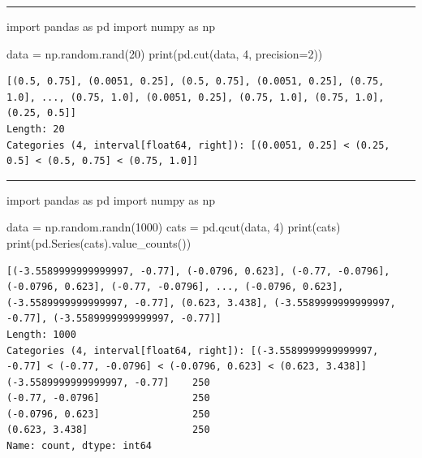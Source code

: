 \documentclass[
  polish,
  letterpaper,
  DIV=11,
  numbers=noendperiod]{scrreprt}
\newenvironment{Shaded}{\begin{snugshade}}{\end{snugshade}}
\newcommand{\BuiltInTok}[1]{\textcolor[rgb]{0.00,0.23,0.31}{#1}}
\newcommand{\DecValTok}[1]{\textcolor[rgb]{0.68,0.00,0.00}{#1}}
\newcommand{\ImportTok}[1]{\textcolor[rgb]{0.00,0.46,0.62}{#1}}
\newcommand{\NormalTok}[1]{\textcolor[rgb]{0.00,0.23,0.31}{#1}}
\newcommand{\OperatorTok}[1]{\textcolor[rgb]{0.37,0.37,0.37}{#1}}
\begin{document}
\begin{center}\rule{0.5\linewidth}{0.5pt}\end{center}

\begin{Shaded}
\begin{Highlighting}[]
\ImportTok{import}\NormalTok{ pandas }\ImportTok{as}\NormalTok{ pd}
\ImportTok{import}\NormalTok{ numpy }\ImportTok{as}\NormalTok{ np}

\NormalTok{data }\OperatorTok{=}\NormalTok{ np.random.rand(}\DecValTok{20}\NormalTok{)}
\BuiltInTok{print}\NormalTok{(pd.cut(data, }\DecValTok{4}\NormalTok{, precision}\OperatorTok{=}\DecValTok{2}\NormalTok{))}
\end{Highlighting}
\end{Shaded}

\begin{verbatim}
[(0.5, 0.75], (0.0051, 0.25], (0.5, 0.75], (0.0051, 0.25], (0.75, 1.0], ..., (0.75, 1.0], (0.0051, 0.25], (0.75, 1.0], (0.75, 1.0], (0.25, 0.5]]
Length: 20
Categories (4, interval[float64, right]): [(0.0051, 0.25] < (0.25, 0.5] < (0.5, 0.75] < (0.75, 1.0]]
\end{verbatim}

\begin{center}\rule{0.5\linewidth}{0.5pt}\end{center}

\begin{Shaded}
\begin{Highlighting}[]
\ImportTok{import}\NormalTok{ pandas }\ImportTok{as}\NormalTok{ pd}
\ImportTok{import}\NormalTok{ numpy }\ImportTok{as}\NormalTok{ np}

\NormalTok{data }\OperatorTok{=}\NormalTok{ np.random.randn(}\DecValTok{1000}\NormalTok{)}
\NormalTok{cats }\OperatorTok{=}\NormalTok{ pd.qcut(data, }\DecValTok{4}\NormalTok{)}
\BuiltInTok{print}\NormalTok{(cats)}
\BuiltInTok{print}\NormalTok{(pd.Series(cats).value\_counts())}
\end{Highlighting}
\end{Shaded}

\begin{verbatim}
[(-3.5589999999999997, -0.77], (-0.0796, 0.623], (-0.77, -0.0796], (-0.0796, 0.623], (-0.77, -0.0796], ..., (-0.0796, 0.623], (-3.5589999999999997, -0.77], (0.623, 3.438], (-3.5589999999999997, -0.77], (-3.5589999999999997, -0.77]]
Length: 1000
Categories (4, interval[float64, right]): [(-3.5589999999999997, -0.77] < (-0.77, -0.0796] < (-0.0796, 0.623] < (0.623, 3.438]]
(-3.5589999999999997, -0.77]    250
(-0.77, -0.0796]                250
(-0.0796, 0.623]                250
(0.623, 3.438]                  250
Name: count, dtype: int64
\end{verbatim}
\end{document}
